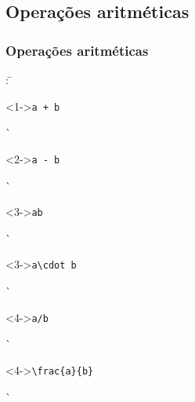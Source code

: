 \documentclass[handout,10pt]{beamer}
\begin{document}
\subsection{Operações aritméticas}
\begin{frame}[fragile]
	\frametitle{Operações aritméticas}
	
	\small
	
	\begin{atividade}{2}
		\begin{tabbing}
		\hspace*{0.3\textwidth}: \=\kill
		           \> \begin{uncoverenv}<1->\verb|a + b|\end{uncoverenv}
		                                                      \`                        \\[1ex]
		       \> \begin{uncoverenv}<2->\verb|a - b|\end{uncoverenv}
		                                                      \`                        \\[1ex]
		 \> \begin{uncoverenv}<3->\verb|ab|\end{uncoverenv}
		                                                      \`                            \\
		                                                   \> \begin{uncoverenv}<3->\verb|a\cdot b|\end{uncoverenv}
		                                                      \`                     \\[1ex]
		       \> \begin{uncoverenv}<4->\verb|a/b|\end{uncoverenv}
		                                                      \`                          \\
		                                                   \> \begin{uncoverenv}<4->\verb|\frac{a}{b}|\end{uncoverenv}
		                                                      \`\onslide<4->{\(\displaystyle\frac{a}{b}\)}
		\end{tabbing}
	\end{atividade}
	

\end{frame}
\end{document}
